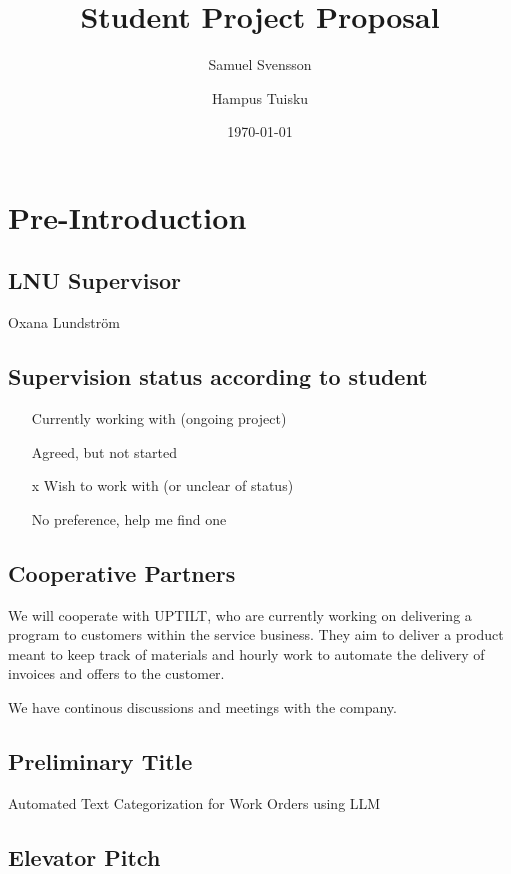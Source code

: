 \documentclass{article}
\title{Student Project Proposal}
\author{Samuel Svensson \and Hampus Tuisku}
\date{\today}
\begin{document}
\maketitle

\section{Pre-Introduction}

\subsection{LNU Supervisor}
Oxana Lundström

\subsection{Supervision status according to student}

\begin{itemize}
      \item [ ] Currently working with (ongoing project)
      \item [ ] Agreed, but not started
      \item [x] Wish to work with (or unclear of status)
      \item [ ] No preference, help me find one
\end{itemize}

\subsection{Cooperative Partners}

We will cooperate with UPTILT, who are currently working on delivering a program
to customers within the service business.
They aim to deliver a product meant to keep track of materials and hourly work
to automate the delivery of invoices and offers to the customer.

We have continous discussions and meetings with the company.

\subsection{Preliminary Title}

Automated Text Categorization for Work Orders using LLM

\subsection{Elevator Pitch}
\end{document}
